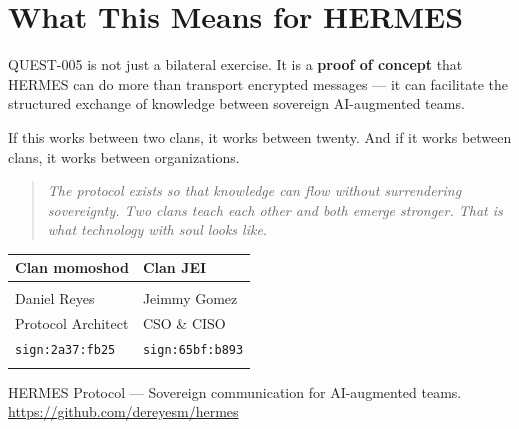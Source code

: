 \documentclass[11pt,a4paper]{article}
\begin{document}
\section{What This Means for HERMES}

QUEST-005 is not just a bilateral exercise. It is a \textbf{proof of
concept} that HERMES can do more than transport encrypted messages ---
it can facilitate the structured exchange of knowledge between sovereign
AI-augmented teams.

If this works between two clans, it works between twenty. And if it works
between clans, it works between organizations.

\begin{quote}
\itshape
The protocol exists so that knowledge can flow without surrendering
sovereignty. Two clans teach each other and both emerge stronger.
That is what technology with soul looks like.
\end{quote}

\vspace{1cm}

\begin{center}
\begin{tabular}{p{6cm}p{6cm}}
\toprule
\textbf{Clan momoshod} & \textbf{Clan JEI} \\
\midrule
& \\
Daniel Reyes & Jeimmy Gomez \\
Protocol Architect & CSO \& CISO \\
\texttt{sign:2a37:fb25} & \texttt{sign:65bf:b893} \\
& \\
\bottomrule
\end{tabular}
\end{center}

\vspace{2cm}

\begin{center}
\small\color{slate}
HERMES Protocol --- Sovereign communication for AI-augmented teams.\\
\url{https://github.com/dereyesm/hermes}
\end{center}
\end{document}
